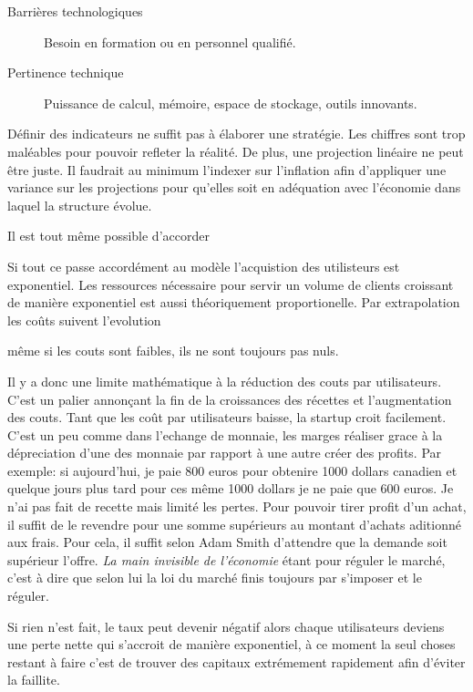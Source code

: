 \documentclass[11pt, a4paper ]{article}
\begin{document}
\begin{spacing}{1.5}
\begin{description}
	\item[Barrières technologiques]
		Besoin en formation ou en personnel qualifié.

	\item[Pertinence technique]
		Puissance de calcul, mémoire, espace de stockage, outils innovants.

\end{description}




Définir des indicateurs ne suffit pas à élaborer une stratégie. Les chiffres sont trop maléables pour pouvoir refleter la réalité. De plus, une projection linéaire ne peut être juste. Il faudrait au minimum l'indexer sur l'inflation afin d'appliquer une variance sur les projections pour qu'elles soit en adéquation avec l'économie dans laquel la structure évolue.

Il est tout même possible d'accorder 

Si tout ce passe accordément au modèle l'acquistion des utilisteurs est exponentiel. Les ressources nécessaire pour servir un volume de clients croissant de manière exponentiel est aussi théoriquement proportionelle. Par extrapolation les coûts suivent l'evolution


 même si les couts sont faibles, ils ne sont toujours pas nuls. 


Il y a donc une limite mathématique à la réduction des couts par utilisateurs. C'est un palier annonçant la fin de la croissances des récettes et l'augmentation des couts. Tant que les coût par utilisateurs baisse, la startup croit facilement. C'est un peu comme dans l'echange de monnaie, les marges réaliser grace à la dépreciation d'une des monnaie par rapport à une autre créer des profits. 
Par exemple: si aujourd'hui, je paie 800 euros pour obtenire 1000 dollars canadien et quelque jours plus tard pour ces même 1000 dollars je ne paie que 600 euros. Je n'ai pas fait de recette mais limité les pertes. Pour pouvoir tirer profit d'un achat, il suffit de le revendre pour une somme supérieurs au montant d'achats aditionné aux frais. 
Pour cela, il suffit selon Adam Smith d'attendre que la demande soit supérieur l'offre. \emph{La main invisible de l'économie}  étant pour réguler le marché, c'est à dire que selon lui la loi du marché finis toujours par s'imposer et le réguler.

Si rien n'est fait, le taux peut devenir négatif alors chaque utilisateurs deviens une perte nette qui s'accroit de manière exponentiel, à ce moment la seul choses restant à faire c'est de trouver des capitaux extrémement rapidement afin d'éviter la faillite. 


\end{spacing}
\end{document}
